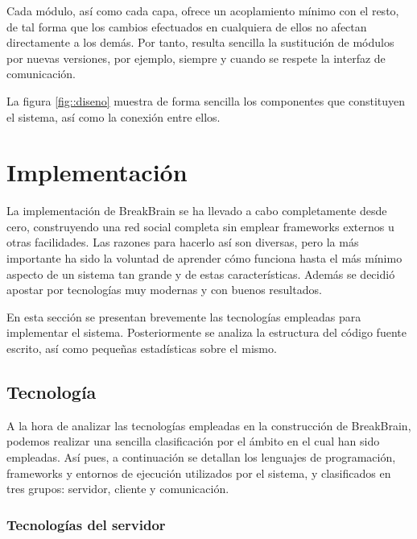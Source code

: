 Cada módulo, así como cada capa, ofrece un acoplamiento mínimo con el resto, de tal forma que los cambios efectuados en cualquiera de ellos no afectan directamente a los demás. Por tanto, resulta sencilla la sustitución de módulos por nuevas versiones, por ejemplo, siempre y cuando se respete la interfaz de comunicación.

La figura \ref{fig::diseno} muestra de forma sencilla los componentes que constituyen el sistema, así como la conexión entre ellos. 

\section{Implementación}
\label{sec::implementacion}

La implementación de BreakBrain se ha llevado a cabo completamente desde cero, construyendo una red social completa sin emplear frameworks externos u otras facilidades. Las razones para hacerlo así son diversas, pero la más importante ha sido la voluntad de aprender cómo funciona hasta el más mínimo aspecto de un sistema tan grande y de estas características. Además se decidió apostar por tecnologías muy modernas y con buenos resultados.

En esta sección se presentan brevemente las tecnologías empleadas para implementar el sistema. Posteriormente se analiza la estructura del código fuente escrito, así como pequeñas estadísticas sobre el mismo.

\subsection{Tecnología}

A la hora de analizar las tecnologías empleadas en la construcción de BreakBrain, podemos realizar una sencilla clasificación por el ámbito en el cual han sido empleadas. Así pues, a continuación se detallan los lenguajes de programación, frameworks y entornos de ejecución utilizados por el sistema, y clasificados en tres grupos: servidor, cliente y comunicación.


\subsubsection{Tecnologías del servidor}

